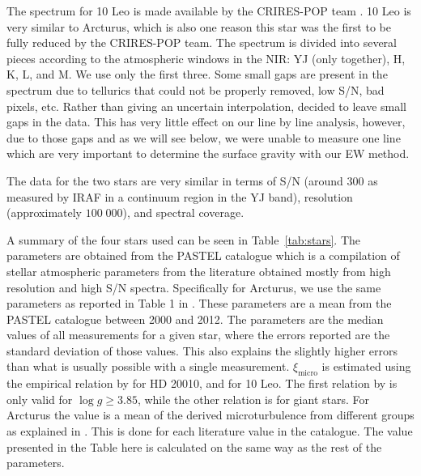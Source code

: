 \documentclass[a4paper,fleqn,usenatbib]{mnras}
\begin{document}
The spectrum for 10 Leo is made available by the CRIRES-POP team
\citep{Nicholls2017}. 10 Leo is very similar to Arcturus, which is also one
reason this star was the first to be fully reduced by the CRIRES-POP team. The
spectrum is divided into several pieces according to the atmospheric windows in
the NIR: YJ (only together), H, K, L, and M. We use only the first three. Some
small gaps are present in the spectrum due to tellurics that could not be
properly removed, low S/N, bad pixels, etc. Rather than giving an uncertain
interpolation, \citet{Nicholls2017} decided to leave small gaps in the data.
This has very little effect on our line by line analysis, however, due to those
gaps and as we will see below, we were unable to measure one  line which are very
important to determine the surface gravity with our EW method.

The data for the two stars are very similar in terms of S/N (around 300 as
measured by IRAF in a continuum region in the YJ band), resolution
(approximately $100\;000$), and spectral coverage.

A summary of the four stars used can be seen in Table~\ref{tab:stars}. The parameters are obtained
from the PASTEL catalogue \citep{Soubiran2016} which is a compilation of stellar atmospheric
parameters from the literature obtained mostly from high resolution and high S/N spectra. 
Specifically for Arcturus, we use the same parameters as reported in Table 1 in \citet{Jofre2014}.
These parameters are a mean from the PASTEL catalogue between 2000 and 2012. The parameters
are the median values of all measurements for a given star, where the errors reported are the
standard deviation of those values. This also explains the slightly higher errors than what is
usually possible with a single measurement. $\xi_\mathrm{micro}$ is estimated using the empirical
relation by \citet{Tsantaki2013} for HD 20010, and \citet{Adibekyan2015} for 10
Leo. The first relation by \citet{Tsantaki2013} is only valid for $\log
g\ge3.85$, while the other relation is for giant stars. For Arcturus the value is a mean of the
derived microturbulence from different groups as explained in \citet{Jofre2014}. This is done for
each literature value in the catalogue. The value presented in the Table here is calculated on the
same way as the rest of the parameters.
\end{document}
